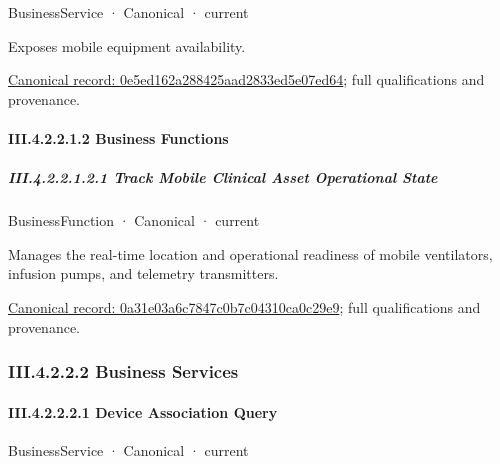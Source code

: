 \label{element:0e5ed162a288425aad2833ed5e07ed64}
{\small BusinessService · Canonical · current}\par

Exposes mobile equipment availability.


{\footnotesize \href{../../../../continuum/business/business-service/0e5ed162a288425aad2833ed5e07ed64.md}{Canonical record: 0e5ed162a288425aad2833ed5e07ed64}; full qualifications and provenance.}\par
\paragraph*{III.4.2.2.1.2 Business Functions}
\label{navigation:III.4.2.2.1.2}

\subparagraph*{III.4.2.2.1.2.1 Track Mobile Clinical Asset Operational State}
\label{navigation:III.4.2.2.1.2.1}

\label{element:0a31e03a6c7847c0b7c04310ca0c29e9}
{\small BusinessFunction · Canonical · current}\par

Manages the real-time location and operational readiness of mobile ventilators, infusion pumps, and telemetry transmitters.


{\footnotesize \href{../../../../continuum/business/business-function/0a31e03a6c7847c0b7c04310ca0c29e9.md}{Canonical record: 0a31e03a6c7847c0b7c04310ca0c29e9}; full qualifications and provenance.}\par
\subsubsection*{III.4.2.2.2 Business Services}
\label{navigation:III.4.2.2.2}

\paragraph*{III.4.2.2.2.1 Device Association Query}
\label{navigation:III.4.2.2.2.1}

\label{element:01637c40914945d68d261c2094b86904}
{\small BusinessService · Canonical · current}\par

